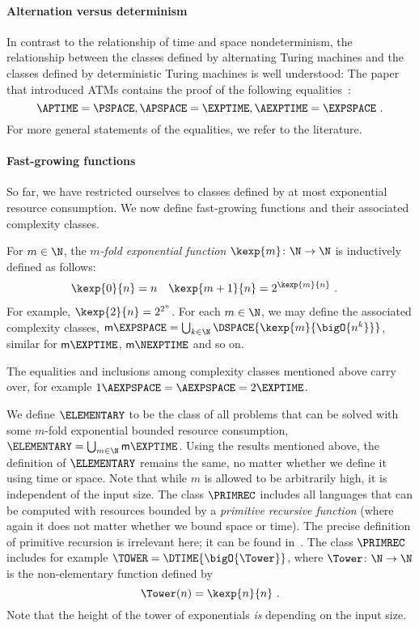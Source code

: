 \documentclass[../../diss.tex]{subfiles}
\begin{document}
\paragraph{Alternation versus determinism}

In contrast to the relationship of time and space \resp nondeterminism, the relationship between the classes defined by alternating Turing machines and the classes defined by deterministic Turing machines is well understood: The paper that introduced ATMs contains the proof of the following equalities~\cite{ChandraKS81}:
\[
    \APTIME = \PSPACE, \APSPACE = \EXPTIME, \AEXPTIME = \EXPSPACE
    \ .
\]
For more general statements of the equalities, we refer to the literature.

\paragraph{Fast-growing functions}

So far, we have restricted ourselves to classes defined by at most exponential resource consumption.
We now define fast-growing functions and their associated complexity classes.

For $m \in \N$, the \emph{$m$-fold exponential function $\kexp{m} \colon \N \to \N$} is inductively defined as follows:
\begin{align*}
    \kexp{0}{n} &= n
    &
    \kexp{m+1}{n} &= 2^{\kexp{m}{n}}
    \ .
\end{align*}
%
For example, $\kexp{2}{n} = 2^{2^n}$.
For each $m \in \N$, we may define the associated complexity classes, \eg $\mathsf{m}\EXPSPACE = \bigcup_{k \in \N} \DSPACE{\kexp{m}{\bigO{n^k}}}$, similar for $\mathsf{m}\EXPTIME$, $\mathsf{m}\NEXPTIME$ and so on.

The equalities and inclusions among complexity classes mentioned above carry over, for example $1\AEXPSPACE = \AEXPSPACE = 2\EXPTIME$.

We define $\ELEMENTARY$ to be the class of all problems that can be solved with some $m$-fold exponential bounded resource consumption, \eg $\ELEMENTARY = \bigcup_{m \in \N} \mathsf{m}\EXPTIME$.
Using the results mentioned above, the definition of $\ELEMENTARY$ remains the same, no matter whether we define it using time or space.
Note that while $m$ is allowed to be arbitrarily high, it is independent of the input size.
The class $\PRIMREC$ includes all languages that can be computed with resources bounded by a \emph{primitive recursive function} (where again it does not matter whether we bound space or time).
The precise definition of primitive recursion is irrelevant here; it can be found \eg in~\cite{Kozen97}.
The class $\PRIMREC$ includes for example $\TOWER = \DTIME{\bigO{\Tower}}$, where $\Tower \colon \N \to \N$ is the  non-elementary function defined by
\[
    \Tower(n) = \kexp{n}{n}
    \ .
\]
Note that the height of the tower of exponentials \emph{is} depending on the input size.
\end{document}
